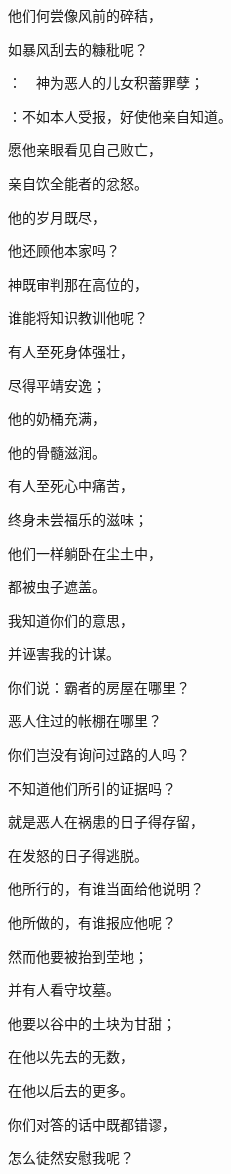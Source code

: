{\par }{\Q {}他们何尝像风前的碎秸，
\par }{\Q 如暴风刮去的糠秕呢？
\par }{\Q {}：　神为恶人的儿女积蓄罪孽；
\par }{：不如本人受报，好使他亲自知道。
\par }{\Q {}愿他亲眼看见自己败亡，
\par }{\Q 亲自饮全能者的忿怒。
\par }{\Q {}他的岁月既尽，
\par }{\Q 他还顾他本家吗？
\par }{\Q {}神既审判那在高位的，
\par }{\Q 谁能将知识教训他呢？
\par }{\Q {}有人至死身体强壮，
\par }{\Q 尽得平靖安逸；
\par }{\Q {}他的奶桶充满，
\par }{\Q 他的骨髓滋润。
\par }{\Q {}有人至死心中痛苦，
\par }{\Q 终身未尝福乐的滋味；
\par }{\Q {}他们一样躺卧在尘土中，
\par }{\Q 都被虫子遮盖。
\par }{\BB \par }{\Q {}我知道你们的意思，
\par }{\Q 并诬害我的计谋。
\par }{\Q {}你们说：霸者的房屋在哪里？
\par }{\Q 恶人住过的帐棚在哪里？
\par }{\Q {}你们岂没有询问过路的人吗？
\par }{\Q 不知道他们所引的证据吗？
\par }{\Q {}就是恶人在祸患的日子得存留，
\par }{\Q 在发怒的日子得逃脱。
\par }{\Q {}他所行的，有谁当面给他说明？
\par }{\Q 他所做的，有谁报应他呢？
\par }{\Q {}然而他要被抬到茔地；
\par }{\Q 并有人看守坟墓。
\par }{\Q {}他要以谷中的土块为甘甜；
\par }{\Q 在他以先去的无数，
\par }{\Q 在他以后去的更多。
\par }{\Q {}你们对答的话中既都错谬，
\par }{\Q 怎么徒然安慰我呢？

}
